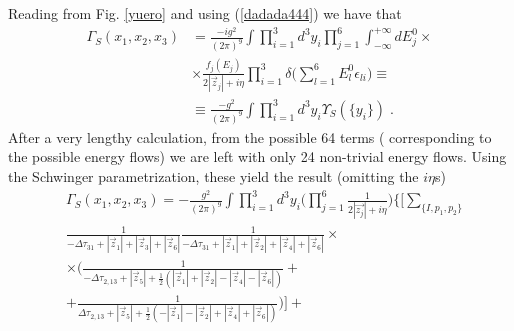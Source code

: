 \documentclass[%
 reprint,
 amsmath,amssymb,
 aps,
]{revtex4-1}
\begin{document}
Reading from Fig. \ref{yuero} and using (\ref{dadada444}) we have that
\begin{align}
 \Gamma_S(x_1,x_2,x_3)&=\frac{-ig^2}{(2\pi)^9}\int\prod_{i=1}^3d^3y_i\prod_{j=1}^6\int_{-\infty}^{+\infty}{dE^0_j}\times\nonumber\\
&\times\frac{f_j(E_j)}{2|{\vec{z}_j}|+i\eta}\prod_{i=1}^3\delta\Big(\sum_{l=1}^6E_{l}^0\epsilon_{li}\Big)\nonumber\equiv\\
 &\equiv\frac{-g^2}{(2\pi)^9}\int\prod_{i=1}^3d^3y_i\varUpsilon_S(\{y_i\})\;.\label{heil}
\end{align}
After a very lengthy calculation, from the possible 64 terms ( corresponding to the possible energy flows) we are left with only 24 non-trivial energy flows. Using the Schwinger parametrization, these yield the result (omitting the $i\eta$s)
\begin{align}
 &\Gamma_S(x_1,x_2,x_3)=-\frac{g^2}{(2\pi)^9}\int\prod_{i=1}^3d^3y_i\Big(\prod_{j=1}^6\frac{1}{2|\vec{z_j}|+i\eta}\Big)\Big\{\Big[\sum_{\{I,p_1,p_2\}} \nonumber\\
 &\frac{1}{-\Delta\tau_{31}+|\vec{z}_1|+|\vec{z}_3|+|\vec{z}_6|}\frac{1}{-\Delta\tau_{31}+|\vec{z}_1|+|\vec{z}_2|+|\vec{z}_4|+|\vec{z}_6|}\nonumber\times\\
& \times \Big(\frac{1}{-\Delta\tau_{2,13}+|\vec{z}_5|+\frac{1}{2}(|\vec{z}_1|+|\vec{z}_2|-|\vec{z}_4|-|\vec{z}_6|)}+\nonumber\\
&+\frac{1}{\Delta\tau_{2,13}+|\vec{z}_5|+\frac{1}{2}(-|\vec{z}_1|-|\vec{z}_2|+|\vec{z}_4|+|\vec{z}_6|)}\Big)\Big]+\nonumber\\

\end{align}
\end{document}
